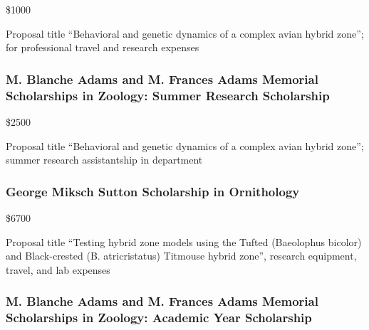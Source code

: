 \documentclass[
  letterpaper,
  DIV=11,
  numbers=noendperiod,
  oneside]{scrreprt}
\begin{document}
\$1000


Proposal title ``Behavioral and genetic dynamics of a complex avian
hybrid zone''; for professional travel and research expenses

\subsubsection{M. Blanche Adams and M. Frances Adams Memorial
Scholarships in Zoology: Summer Research
Scholarship}\label{m.-blanche-adams-and-m.-frances-adams-memorial-scholarships-in-zoology-summer-research-scholarship-1}

\$2500


Proposal title ``Behavioral and genetic dynamics of a complex avian
hybrid zone''; summer research assistantship in department

\subsubsection{George Miksch Sutton Scholarship in
Ornithology}\label{george-miksch-sutton-scholarship-in-ornithology-1}

\$6700


Proposal title ``Testing hybrid zone models using the Tufted (Baeolophus
bicolor) and Black-crested (B. atricristatus) Titmouse hybrid zone'',
research equipment, travel, and lab expenses

\subsubsection{M. Blanche Adams and M. Frances Adams Memorial
Scholarships in Zoology: Academic Year
Scholarship}\label{m.-blanche-adams-and-m.-frances-adams-memorial-scholarships-in-zoology-academic-year-scholarship-1}
\end{document}

